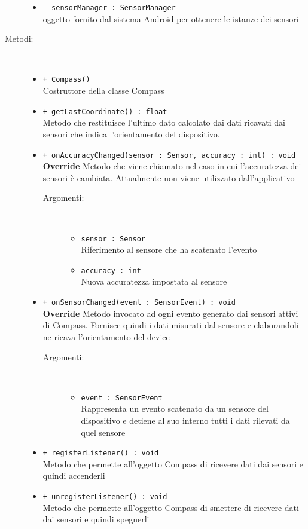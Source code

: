 \documentclass[../DefinizioneDiProdotto.tex]{subfiles}
\begin{document}
\begin{description}
\begin{itemize}
\item \texttt{- sensorManager : SensorManager}\\
oggetto fornito dal sistema Android per ottenere le istanze dei sensori

\end{itemize}
\item[Metodi:] \
\begin{itemize}
\item \texttt{+ Compass()}\\
Costruttore della classe Compass
 \item \texttt{+ getLastCoordinate() : float}\\
Metodo che restituisce l'ultimo dato calcolato dai dati ricavati dai sensori che indica l'orientamento del dispositivo.
 \item \texttt{+ onAccuracyChanged(sensor : Sensor, accuracy : int) : void}\\
\textbf{Override} Metodo che viene chiamato nel caso in cui l'accuratezza dei sensori è cambiata. Attualmente non viene utilizzato dall'applicativo
 \begin{description}
\item[Argomenti:] \
\begin{itemize}
\item \texttt{sensor : Sensor}\\
Riferimento al sensore che ha scatenato l'evento\item \texttt{accuracy : int}\\
Nuova accuratezza impostata al sensore \end{itemize}
\end{description}
\item \texttt{+ onSensorChanged(event : SensorEvent) : void}\\
\textbf{Override} Metodo invocato ad ogni evento generato dai sensori attivi di Compass. Fornisce quindi i dati misurati dal sensore e elaborandoli ne ricava l'orientamento del device
 \begin{description}
\item[Argomenti:] \
\begin{itemize}
\item \texttt{event : SensorEvent}\\
Rappresenta un evento scatenato da un sensore del dispositivo e detiene al suo interno tutti i dati rilevati da quel sensore\end{itemize}
\end{description}
\item \texttt{+ registerListener() : void}\\
Metodo che permette all'oggetto Compass di ricevere dati dai sensori e quindi accenderli
 \item \texttt{+ unregisterListener() : void}\\
Metodo che permette all'oggetto Compass di smettere di ricevere dati dai sensori e quindi spegnerli
 \end{itemize}
\end{description}
\end{document}
